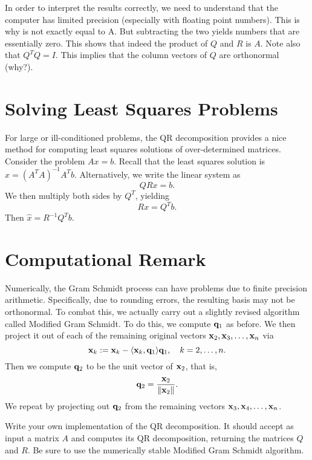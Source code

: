 In order to interpret the results correctly, we need to understand that the computer has limited precision (especially with floating point numbers).  This is why  is not exactly equal to A.  But subtracting the two yields numbers that are essentially zero.  This shows that indeed the product of $Q$ and $R$ is $A$.  Note also that $Q^T Q = I$.  This implies that the column vectors of $Q$ are orthonormal (why?).

\section*{Solving Least Squares Problems}

For large or ill-conditioned problems, the QR decomposition provides
a nice method for computing least squares solutions of
over-determined matrices.  Consider the problem $A x = b$.  Recall
that the least squares solution is $\widehat x = (A^T A)^{-1}A^T b$.
Alternatively, we write the linear system as
\[
Q R x = b.
\]
We then multiply both sides by $Q^T$, yielding
\[
R x = Q^T b.
\]
Then $\widehat x = R^{-1} Q^T b$.

\section*{Computational Remark}

Numerically, the Gram Schmidt process can have problems due to
finite precision arithmetic. Specifically, due to rounding errors,
the resulting basis may not be orthonormal. To combat this, we
actually carry out a slightly revised algorithm called Modified Gram
Schmidt.  To do this, we compute ${\bf q}_1$ as before.  We then project
it out of each of the remaining original vectors
${\bf x}_2,{\bf x}_3,\ldots,{\bf x}_n$ via
\[
{\bf x}_k := {\bf x}_k - \langle {\bf x}_{k}, {\bf q}_1\rangle {\bf q}_1,\quad k=2,\ldots,n.
\]
Then we compute ${\bf q}_2$ to be the unit vector of ${\bf x}_2$, that is,
\[
{\bf q}_2 = \frac{{\bf x}_2}{\|{\bf x}_2\|}.
\]
We repeat by projecting out ${\bf q}_2$ from the remaining vectors
${\bf x}_3,{\bf x}_4,\ldots,{\bf x}_n$.

\begin{problem}
\label{prob:QR}
Write your own implementation of the QR decomposition.  It should accept as input a matrix $A$ and computes its QR decomposition, returning the matrices $Q$ and $R$. Be sure to use the numerically stable Modified Gram Schmidt algorithm.
\end{problem}
